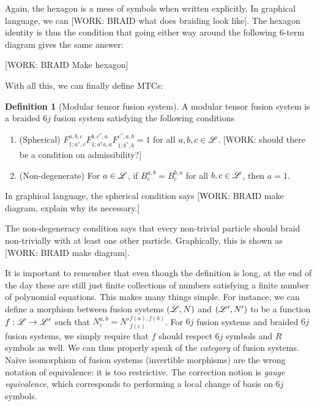 \documentclass{article}
\theoremstyle{definition}
\newtheorem*{definition}{Definition}
\numberwithin{figure}{section}
\begin{document}
Again, the hexagon is a mess of symbols when written explicitly. In graphical language, we can [WORK: BRAID what does braiding look like]. The hexagon identity is thus the condition that going either way around the following 6-term diagram gives the same answer:

[WORK: BRAID Make hexagon]

With all this, we can finally define MTCs:

\begin{definition}[Modular tensor fusion system] A modular tensor fusion system is a braided $6j$ fusion system satisfying the following conditions

\begin{enumerate}

\item (Spherical) $F^{a,b,c}_{1;a^*,c}F^{b,c^*,a}_{1;a^*a,a}F^{c^*,a,b}_{1;b^*,b}=1$ for all $a,b,c\in \mathscr{L}$. [WORK: should there be a condition on admissibility?]

\item (Non-degenerate) For $a\in \mathscr{L}$, if $B_c^{a,b}=B_c^{b,a}$ for all $b,c\in \mathscr{L}$, then $a=1$.
\end{enumerate}
\raggedleft\qedsymbol{}
\end{definition}

In graphical language, the spherical condition says [WORK: BRAID make diagram, explain why its necessary.]

The non-degeneracy condition says that every non-trivial particle should braid non-trivially with at least one other particle. Graphically, this is shown as [WORK: BRAID make diagram].

It is important to remember that even though the definition is long, at the end of the day these are still just finite collections of numbers satisfying a finite number of polynomial equations. This makes many things simple. For instance, we can define a morphism between fusion systems $(\mathscr{L},N)$ and $(\mathscr{L}',N')$ to be a function $f:\mathscr{L}\to \mathscr{L}'$ such that $N^{a,b}_{c}=N'^{f(a),f(b)}_{f(c)}$. For $6j$ fusion systems and braided $6j$ fusion systems, we simply require that $f$ should respect $6j$ symbols and $R$ symbols as well. We can thus properly speak of the \textit{category} of fusion systems. Naïve isomorphism of fusion systems (invertible morphisms) are the wrong notation of equivalence: it is too restrictive. The correction notion is \textit{gauge equivalence}, which corresponds to performing a local change of basis on $6j$ symbols.
\end{document}
